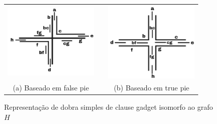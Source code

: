 \begin{figure}[htb]
  \centering
  \begin{tabular}{c c c }
    \includegraphics[width=4.5cm]{./img/falsePie.png}  %
    & &\includegraphics[width=4.5cm]{./img/truePie.png} %
    \\%
    {\footnotesize (a) Baseado em false pie}  & &  {\footnotesize(b) Baseado em true pie}\\
  \end{tabular}
  \caption{Representação de dobra simples  de clause gadget isomorfo ao grafo $H$} \label{fig:falseAndTruePie}
\end{figure} 